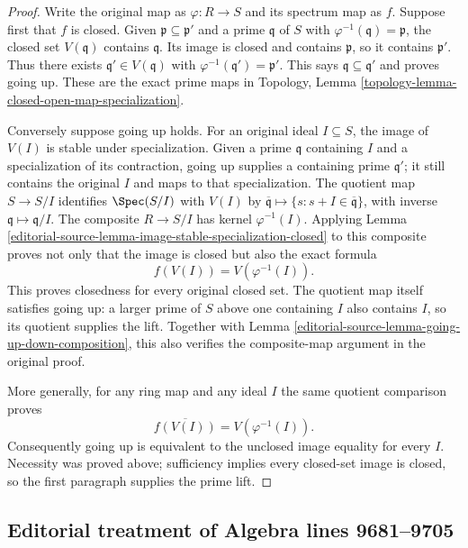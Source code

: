 \begin{proof}
Write the original map as $\varphi:R\to S$ and its
spectrum map as $f$. Suppose first that $f$ is closed.
Given $\mathfrak p\subseteq\mathfrak p'$ and a prime
$\mathfrak q$ of $S$ with $\varphi^{-1}(\mathfrak q)=\mathfrak p$,
the closed set $V(\mathfrak q)$ contains $\mathfrak q$.
Its image is closed and contains $\mathfrak p$, so it
contains $\mathfrak p'$. Thus there exists
$\mathfrak q'\in V(\mathfrak q)$ with
$\varphi^{-1}(\mathfrak q')=\mathfrak p'$.
This says $\mathfrak q\subseteq\mathfrak q'$ and proves
going up. These are the exact prime maps in
Topology, Lemma \ref{topology-lemma-closed-open-map-specialization}.

Conversely suppose going up holds. For an original
ideal $I\subseteq S$, the image of $V(I)$ is stable
under specialization. Given a prime $\mathfrak q$
containing $I$ and a specialization of its contraction,
going up supplies a containing prime $\mathfrak q'$;
it still contains the original $I$ and maps to that
specialization. The quotient map $S\to S/I$ identifies
$\Spec(S/I)$ with $V(I)$ by
$\overline{\mathfrak q}\mapsto\{s:s+I\in\overline{\mathfrak q}\}$,
with inverse $\mathfrak q\mapsto\mathfrak q/I$.
The composite $R\to S/I$ has kernel $\varphi^{-1}(I)$.
Applying Lemma \ref{editorial-source-lemma-image-stable-specialization-closed}
to this composite proves not only that the image is
closed but also the exact formula
$$
f(V(I))=V(\varphi^{-1}(I)).
$$
This proves closedness for every original closed set.
The quotient map itself satisfies going up: a larger
prime of $S$ above one containing $I$ also contains
$I$, so its quotient supplies the lift. Together
with Lemma \ref{editorial-source-lemma-going-up-down-composition}, this
also verifies the composite-map argument in the original proof.

More generally, for any ring map and any ideal $I$
the same quotient comparison proves
$$
\overline{f(V(I))}=V(\varphi^{-1}(I)).
$$
Consequently going up is equivalent to the unclosed
image equality for every $I$. Necessity was proved
above; sufficiency implies every closed-set image is
closed, so the first paragraph supplies the prime lift.
\end{proof}


\subsection{Editorial treatment of Algebra lines 9681--9705}

\hypertarget{algebra-context-110}{}

